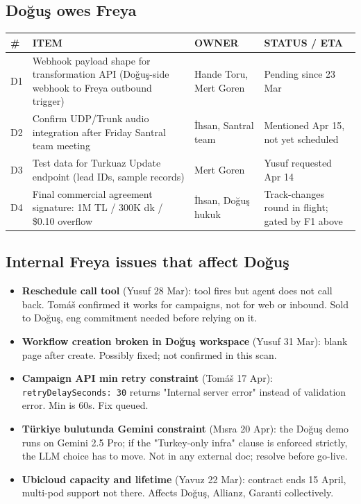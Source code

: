 \documentclass[10pt,a4paper]{article}
\begin{document}
\subsection{Doğuş owes Freya}

\begin{tabularx}{\linewidth}{@{}L{0.5cm}L{6.0cm}L{2.4cm}X@{}}
\toprule
{}\textbf{\color{white}\footnotesize \#} & \textbf{\color{white}\footnotesize ITEM} & \textbf{\color{white}\footnotesize OWNER} & \textbf{\color{white}\footnotesize STATUS / ETA} \\
\midrule
D1 & Webhook payload shape for transformation API (Doğuş-side webhook to Freya outbound trigger) & Hande Toru, Mert Goren & Pending since 23 Mar \\
D2 & Confirm UDP/Trunk audio integration after Friday Santral team meeting & İhsan, Santral team & Mentioned Apr 15, not yet scheduled \\
D3 & Test data for Turkuaz Update endpoint (lead IDs, sample records) & Mert Goren & Yusuf requested Apr 14 \\
D4 & Final commercial agreement signature: 1M TL / 300K dk / \$0.10 overflow & İhsan, Doğuş hukuk & Track-changes round in flight; gated by F1 above \\
\bottomrule
\end{tabularx}

\subsection{Internal Freya issues that affect Doğuş}

\begin{itemize}[leftmargin=1em,itemsep=0.2em]
\item \textbf{Reschedule call tool} (Yusuf 28 Mar): tool fires but agent does not call back. Tomáš confirmed it works for campaigns, not for web or inbound. Sold to Doğuş, eng commitment needed before relying on it.
\item \textbf{Workflow creation broken in Doğuş workspace} (Yusuf 31 Mar): blank page after create. Possibly fixed; not confirmed in this scan.
\item \textbf{Campaign API min retry constraint} (Tomáš 17 Apr): \texttt{retryDelaySeconds: 30} returns "Internal server error" instead of validation error. Min is 60s. Fix queued.
\item \textbf{Türkiye bulutunda Gemini constraint} (Mısra 20 Apr): the Doğuş demo runs on Gemini 2.5 Pro; if the "Turkey-only infra" clause is enforced strictly, the LLM choice has to move. Not in any external doc; resolve before go-live.
\item \textbf{Ubicloud capacity and lifetime} (Yavuz 22 Mar): contract ends 15 April, multi-pod support not there. Affects Doğuş, Allianz, Garanti collectively.
\end{itemize}
\end{document}
